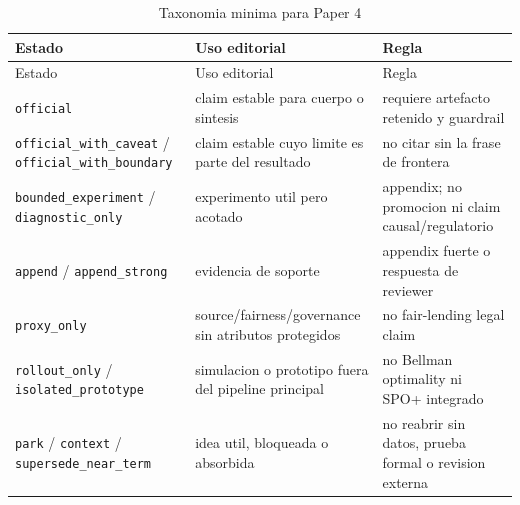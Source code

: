 \documentclass[
  spanish,
  11pt,
  letterpaper,
]{scrbook}
\theoremstyle{plain}
\theoremstyle{remark}
\begin{document}
\begin{longtable}[]{@{}
  >{\raggedright\arraybackslash}p{}
  >{\raggedright\arraybackslash}p{}
  >{\raggedright\arraybackslash}p{}@{}}
\caption{Taxonomia minima para Paper
4}\label{tbl-paper4-status-taxonomy}\tabularnewline
\toprule\noalign{}
\begin{minipage}[b]{\linewidth}\raggedright
Estado
\end{minipage} & \begin{minipage}[b]{\linewidth}\raggedright
Uso editorial
\end{minipage} & \begin{minipage}[b]{\linewidth}\raggedright
Regla
\end{minipage} \\
\midrule\noalign{}
\endfirsthead
\toprule\noalign{}
\begin{minipage}[b]{\linewidth}\raggedright
Estado
\end{minipage} & \begin{minipage}[b]{\linewidth}\raggedright
Uso editorial
\end{minipage} & \begin{minipage}[b]{\linewidth}\raggedright
Regla
\end{minipage} \\
\midrule\noalign{}
\endhead
\bottomrule\noalign{}
\endlastfoot
\texttt{official} & claim estable para cuerpo o sintesis & requiere
artefacto retenido y guardrail \\
\texttt{official\_with\_caveat} / \texttt{official\_with\_boundary} &
claim estable cuyo limite es parte del resultado & no citar sin la frase
de frontera \\
\texttt{bounded\_experiment} / \texttt{diagnostic\_only} & experimento
util pero acotado & appendix; no promocion ni claim
causal/regulatorio \\
\texttt{append} / \texttt{append\_strong} & evidencia de soporte &
appendix fuerte o respuesta de reviewer \\
\texttt{proxy\_only} & source/fairness/governance sin atributos
protegidos & no fair-lending legal claim \\
\texttt{rollout\_only} / \texttt{isolated\_prototype} & simulacion o
prototipo fuera del pipeline principal & no Bellman optimality ni SPO+
integrado \\
\texttt{park} / \texttt{context} / \texttt{supersede\_near\_term} & idea
util, bloqueada o absorbida & no reabrir sin datos, prueba formal o
revision externa \\
\end{longtable}
\end{document}
